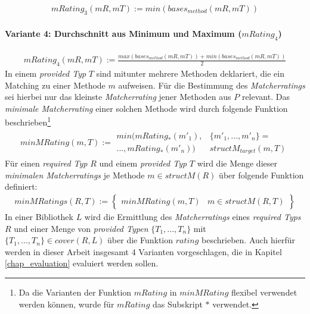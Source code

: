 \begin{gather*}
\mathit{mRating_3(mR,mT)} := \mathit{min(bases_{method}(mR,mT))}
\end{gather*}

\paragraph{Variante 4: Durchschnitt aus Minimum und Maximum ($\mathit{mRating}_4$)}

\begin{gather*}
\mathit{mRating_4(mR,mT)} := \frac{\mathit{max(bases_{method}(mR,mT))}+\mathit{min(bases_{method}(mR,mT))}}{2}
\end{gather*}
\noindent
In einem \emph{provided Typ} $T$ sind mitunter mehrere Methoden deklariert, die ein Matching zu einer Methode $m$ aufweisen. Für die Bestimmung des \emph{Matcherratings} sei hierbei nur das kleinste \emph{Matcherrating} jener Methoden aus $P$ relevant. Das \emph{minimale Matcherrating} einer solchen Methode wird durch folgende Funktion beschrieben\footnote{Da die Varianten der Funktion $\mathit{mRating}$ in $\mathit{minMRating}$ flexibel verwendet werden können, wurde für $\mathit{mRating}$ das Subskript $*$ verwendet.}
\begin{gather*}
\mathit{minMRating(m, T)} := 
	\begin{array}{l|l}
\mathit{min(mRating_*(m'_1),}
&
\{\mathit{m'_1,...,m'_n}\} =
\\
\mathit{...,mRating_*(m'_n))}
&
\mathit{structM_{target}(m, T)}
\end{array}
\end{gather*}
\noindent
Für einen \emph{required Typ} $R$ und einem \emph{provided Typ} $T$ wird die Menge dieser \emph{minimalen Matcherratings} je Methode $m \in \mathit{structM(R)}$ über folgende Funktion definiert:
\begin{gather*}
\mathit{minMRatings(R,T)} := \left\{
\begin{array}{l|l}
	\mathit{minMRating(m,T)}
	& 
	m \in \mathit{structM(R,T)}
\end{array}
\right\}
\end{gather*}
\noindent
In einer Bibliothek $L$ wird die Ermittlung des \emph{Matcherratings} eines \emph{required Typs} $R$ und einer Menge von \emph{provided Typen} $\{T_1,...,T_n\}$ mit $\{T_1,...,T_n\} \in \mathit{cover(R,L)}$ über die Funktion $\mathit{rating}$ beschrieben. Auch hierfür werden in dieser Arbeit insgesamt 4 Varianten vorgeschlagen, die in Kapitel \ref{chap_evaluation} evaluiert werden sollen.
